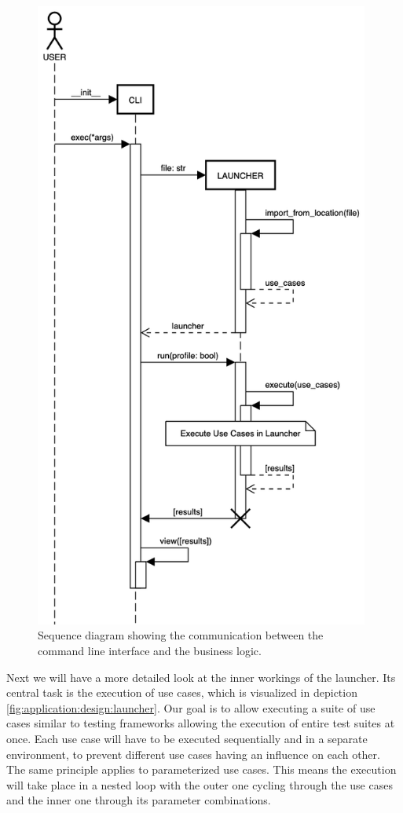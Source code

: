 \begin{figure}[h]
    \centering
    \includegraphics[width=11cm]{resources/img/sequence/cli}
    \caption{
        Sequence diagram showing the communication between the command line
        interface and the business logic.
    }
    \label{fig:application:design:cli}
\end{figure}


Next we will have a more detailed look at the inner workings of the launcher.
Its central task is the execution of use cases, which is visualized in depiction
\ref{fig:application:design:launcher}. Our goal is to allow executing a suite of
use cases similar to testing frameworks allowing the execution of entire test
suites at once. Each use case will have to be executed sequentially and in a
separate environment, to prevent different use cases having an influence on each
other.  The same principle applies to parameterized use cases. This means the
execution will take place in a nested loop with the outer one cycling through
the use cases and the inner one through its parameter combinations.

